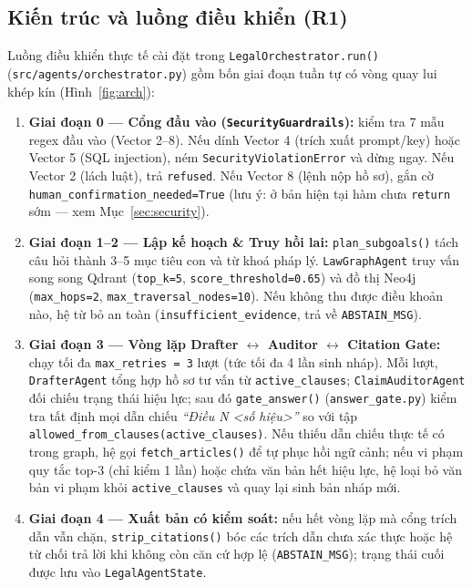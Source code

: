\documentclass[sigconf,nonacm]{acmart}
\begin{document}
\subsection{Kiến trúc và luồng điều khiển (R1)}
Luồng điều khiển thực tế cài đặt trong \texttt{LegalOrchestrator.run()} (\texttt{src/agents/orchestrator.py}) gồm bốn giai đoạn tuần tự có vòng quay lui khép kín (Hình~\ref{fig:arch}):
\begin{enumerate}[leftmargin=*]
  \item \textbf{Giai đoạn 0 --- Cổng đầu vào (\texttt{SecurityGuardrails}):} kiểm tra 7 mẫu regex đầu vào (Vector 2--8). Nếu dính Vector 4 (trích xuất prompt/key) hoặc Vector 5 (SQL injection), ném \texttt{SecurityViolationError} và dừng ngay. Nếu Vector 2 (lách luật), trả \texttt{refused}. Nếu Vector 8 (lệnh nộp hồ sơ), gắn cờ \texttt{human\_confirmation\_needed=True} (lưu ý: ở bản hiện tại hàm chưa \texttt{return} sớm — xem Mục~\ref{sec:security}).
  \item \textbf{Giai đoạn 1--2 --- Lập kế hoạch \& Truy hồi lai:} \texttt{plan\_subgoals()} tách câu hỏi thành 3--5 mục tiêu con và từ khoá pháp lý. \texttt{LawGraphAgent} truy vấn song song Qdrant (\texttt{top\_k=5}, \texttt{score\_threshold=0.65}) và đồ thị Neo4j (\texttt{max\_hops=2}, \texttt{max\_traversal\_nodes=10}). Nếu không thu được điều khoản nào, hệ từ bỏ an toàn (\texttt{insufficient\_evidence}, trả về \texttt{ABSTAIN\_MSG}).
  \item \textbf{Giai đoạn 3 --- Vòng lặp Drafter $\leftrightarrow$ Auditor $\leftrightarrow$ Citation Gate:} chạy tối đa \texttt{max\_retries = 3} lượt (tức tối đa 4 lần sinh nháp). Mỗi lượt, \texttt{DrafterAgent} tổng hợp hồ sơ tư vấn từ \texttt{active\_clauses}; \texttt{ClaimAuditorAgent} đối chiếu trạng thái hiệu lực; sau đó \texttt{gate\_answer()} (\texttt{answer\_gate.py}) kiểm tra tất định mọi dẫn chiếu \emph{``Điều N <số hiệu>''} so với tập \texttt{allowed\_from\_clauses(active\_clauses)}. Nếu thiếu dẫn chiếu thực tế có trong graph, hệ gọi \texttt{fetch\_articles()} để tự phục hồi ngữ cảnh; nếu vi phạm quy tắc top-3 (chỉ kiểm 1 lần) hoặc chứa văn bản hết hiệu lực, hệ loại bỏ văn bản vi phạm khỏi \texttt{active\_clauses} và quay lại sinh bản nháp mới.
  \item \textbf{Giai đoạn 4 --- Xuất bản có kiểm soát:} nếu hết vòng lặp mà cổng trích dẫn vẫn chặn, \texttt{strip\_citations()} bóc các trích dẫn chưa xác thực hoặc hệ từ chối trả lời khi không còn căn cứ hợp lệ (\texttt{ABSTAIN\_MSG}); trạng thái cuối được lưu vào \texttt{LegalAgentState}.
\end{enumerate}
\end{document}
